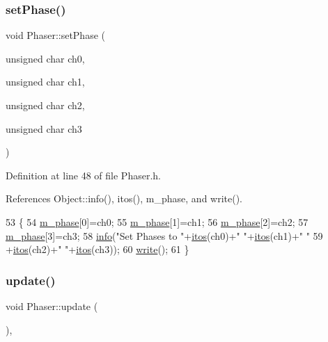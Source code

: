 \subsubsection{\texorpdfstring{set\+Phase()}{setPhase()}\hspace{0.1cm}{\footnotesize\ttfamily [2/2]}}
{\footnotesize\ttfamily void Phaser\+::set\+Phase (\begin{DoxyParamCaption}\item[{unsigned char}]{ch0,  }\item[{unsigned char}]{ch1,  }\item[{unsigned char}]{ch2,  }\item[{unsigned char}]{ch3 }\end{DoxyParamCaption})\hspace{0.3cm}{\ttfamily [inline]}}



Definition at line 48 of file Phaser.\+h.



References Object\+::info(), itos(), m\+\_\+phase, and write().


\begin{DoxyCode}
53        \{
54     \hyperlink{classPhaser_a04df9ce4afe7a36ccaba5e5e727d504e}{m\_phase}[0]=ch0;
55     \hyperlink{classPhaser_a04df9ce4afe7a36ccaba5e5e727d504e}{m\_phase}[1]=ch1;
56     \hyperlink{classPhaser_a04df9ce4afe7a36ccaba5e5e727d504e}{m\_phase}[2]=ch2;
57     \hyperlink{classPhaser_a04df9ce4afe7a36ccaba5e5e727d504e}{m\_phase}[3]=ch3;
58     \hyperlink{classObject_a644fd329ea4cb85f54fa6846484b84a8}{info}(\textcolor{stringliteral}{"Set Phases to "}+\hyperlink{Tools_8h_af330027dbdafb9a30768b3613c553e60}{itos}(ch0)+\textcolor{stringliteral}{" "}+\hyperlink{Tools_8h_af330027dbdafb9a30768b3613c553e60}{itos}(ch1)+\textcolor{stringliteral}{" "}
59         +\hyperlink{Tools_8h_af330027dbdafb9a30768b3613c553e60}{itos}(ch2)+\textcolor{stringliteral}{" "}+\hyperlink{Tools_8h_af330027dbdafb9a30768b3613c553e60}{itos}(ch3));
60     \hyperlink{classPhaser_a7a94d4129a5f743c482fa97f3c5df68f}{write}();
61   \}
\end{DoxyCode}
\mbox{\label{classPhaser_ae1d1d3be2eed3973d269eab78834c594}} 
\subsubsection{\texorpdfstring{update()}{update()}}
{\footnotesize\ttfamily void Phaser\+::update (\begin{DoxyParamCaption}{ }\end{DoxyParamCaption})\hspace{0.3cm}{\ttfamily [inline]}, {\ttfamily [virtual]}}

